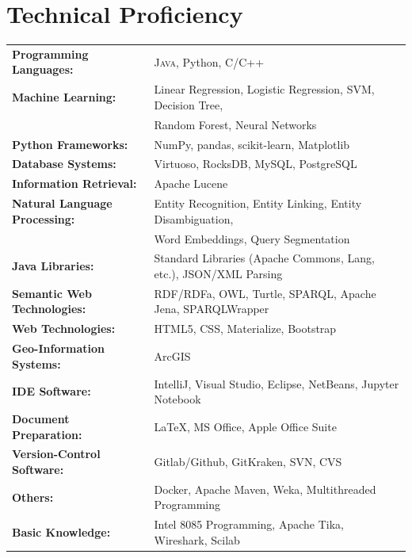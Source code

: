 \documentclass[a4paper,10pt]{article} %
\begin{document}

\section{Technical Proficiency}

\begin{tabular}{ll}
\textbf{Programming Languages:} & \textsc{Java}, Python, \textsc{C/C++}\\
\textbf{Machine Learning:} & Linear Regression, Logistic Regression, SVM, Decision Tree,\\
						   & Random Forest, Neural Networks \\
\textbf{Python Frameworks:} & NumPy, pandas, scikit-learn, Matplotlib \\
\textbf{Database Systems:} & Virtuoso, RocksDB, My\textsc{SQL}, Postgre\textsc{SQL}\\
\textbf{Information Retrieval:} & Apache Lucene\\
\textbf{Natural Language Processing:} & Entity Recognition, Entity Linking, Entity Disambiguation,\\
									  & Word Embeddings, Query Segmentation\\
\textbf{Java Libraries:} & Standard Libraries (Apache Commons, Lang, etc.), JSON/XML Parsing\\
\textbf{Semantic Web Technologies:} & RDF/RDFa, \textsc{OWL}, Turtle, \textsc{SPARQL}, Apache Jena, SPARQLWrapper\\
\textbf{Web Technologies:} & HTML5, CSS, Materialize, Bootstrap\\
\textbf{Geo-Information Systems:} & ArcGIS\\
\textbf{IDE Software:} & IntelliJ, Visual Studio, Eclipse, NetBeans, Jupyter Notebook\\
\textbf{Document Preparation:} & LaTeX, MS Office, Apple Office Suite\\
\textbf{Version-Control Software:} & Gitlab/Github, GitKraken, \textsc{SVN}, \textsc{CVS}\\
\textbf{Others:} & Docker, Apache Maven, Weka, Multithreaded Programming\\
\textbf{Basic Knowledge:} & Intel 8085 Programming,  Apache Tika, Wireshark, Scilab\\
\end{tabular}
\\
\end{document}
